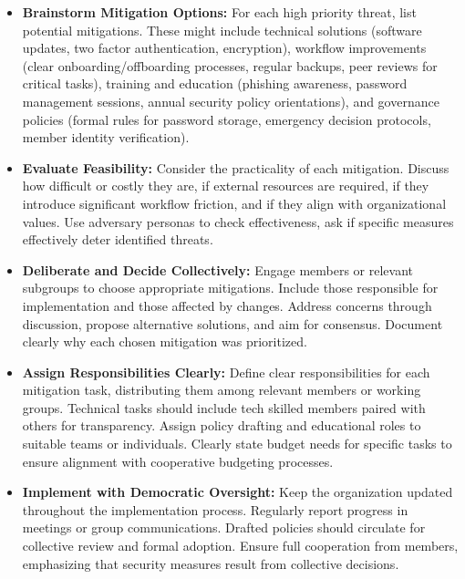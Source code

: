 \begin{itemize}

    \item \textbf{Brainstorm Mitigation Options:} For each high priority threat,
    list potential mitigations. These might include technical solutions (software
    updates, two factor authentication, encryption), workflow improvements
    (clear onboarding/offboarding processes, regular backups, peer reviews
    for critical tasks), training and education (phishing awareness, password
    management sessions, annual security policy orientations), and governance
    policies (formal rules for password storage, emergency decision protocols,
    member identity verification).
    
    \item \textbf{Evaluate Feasibility:} Consider the practicality of each
    mitigation. Discuss how difficult or costly they are, if external resources are
    required, if they introduce significant workflow friction, and if they align
    with organizational values. Use adversary personas to check effectiveness, ask if
    specific measures effectively deter identified threats.
    
    \item \textbf{Deliberate and Decide Collectively:} Engage members or relevant
    subgroups to choose appropriate mitigations. Include those responsible for
    implementation and those affected by changes. Address concerns through
    discussion, propose alternative solutions, and aim for consensus. Document
    clearly why each chosen mitigation was prioritized.
    
    \item \textbf{Assign Responsibilities Clearly:} Define clear responsibilities
    for each mitigation task, distributing them among relevant members or working
    groups. Technical tasks should include tech skilled members paired with others
    for transparency. Assign policy drafting and educational roles to suitable teams
    or individuals. Clearly state budget needs for specific tasks to ensure
    alignment with cooperative budgeting processes.
    
    \item \textbf{Implement with Democratic Oversight:} Keep the organization
    updated throughout the implementation process. Regularly report progress in
    meetings or group communications. Drafted policies should circulate for
    collective review and formal adoption. Ensure full cooperation from members,
    emphasizing that security measures result from collective decisions.
    

\end{itemize}
